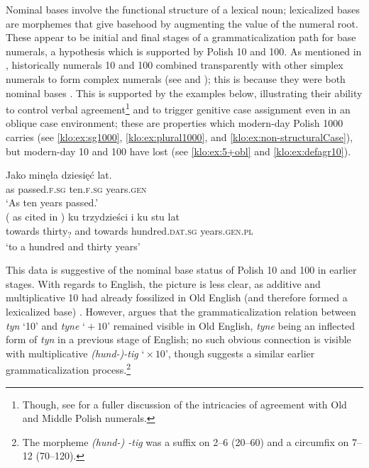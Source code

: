\documentclass[output=paper]{langscibook}
\begin{document}
Nominal bases involve the functional structure of a lexical noun; lexicalized bases are morphemes that give basehood by augmenting the value of the numeral root. These appear to be initial and final stages of a grammaticalization path for base numerals, a hypothesis which is supported by Polish 10 and 100. As mentioned in , historically numerals 10 and 100 combined transparently with other simplex numerals to form complex numerals (see \citealt{miechowicz2014hist} and \citealt{dziubala2014num}); this is because they were both nominal bases \citep[see also][]{miechowicz2014hist}. This is supported by the examples below, illustrating their ability to control verbal agreement\footnote{Though, see \citet{miechowicz2014hist} for a fuller discussion of the intricacies of agreement with Old and Middle Polish numerals.} and to trigger genitive case assignment even in an oblique case environment; these are properties which modern-day Polish 1000 carries (see \ref{klo:ex:sg1000}, \ref{klo:ex:plural1000}, and \ref{klo:ex:non-structuralCase}), but modern-day 10 and 100 have lost (see \ref{klo:ex:5+obl} and \ref{klo:ex:defagr10}).

\ea \label{klo:ex:nominal10,100}
\ea \gll Jako minęła dziesięć lat.\\
as passed.\textsc{f.sg} ten.\textsc{f.sg} years.\textsc{gen}\\
\glt `As ten years passed.'\\\hfill(\citealt{siuciak2008ksztaltowanie} as cited in \citealt[103]{dziubala2014num})
\ex \gll ku trzydzieści i ku stu lat\\
towards thirty\textsubscript{?} and towards hundred.\textsc{dat.sg}  years.\textsc{gen.pl}\\
\glt `to a hundred and thirty years' \hfill\citep[99]{miechowicz2013agrhist}
\z \z

\noindent This data is suggestive of the nominal base status of Polish 10 and 100 in earlier stages. With regards to English, the picture is less clear, as additive and multiplicative 10 had already fossilized in Old English (and therefore formed a lexicalized base) \citep{von2010cardinal}. However, \citet{von2010cardinal} argues that the grammaticalization relation between \textit{tyn} `10' and \textit{tyne} `${}+10$' remained visible in Old English, \textit{tyne} being an inflected form of \textit{tyn} in a previous stage of English; no such obvious connection is visible with multiplicative \textit{(hund-)-tig} `${}\times 10$', though \citet{von2010cardinal} suggests a similar earlier grammaticalization process.\footnote{The morpheme \textit{(hund-) -tig} was a suffix on 2--6 (20--60) and a circumfix on 7--12 (70--120).}
\end{document}
